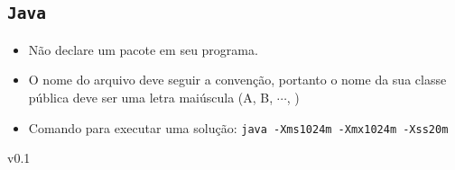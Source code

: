\documentclass{UnBExam}%
\newcommand{\infoFooter}{%
	\begin{center}\small v0.1\end{center}%
}%
\begin{document}
	\subsection*{\texttt{Java}}%
	\begin{itemize}%
		\setlength{\itemsep}{0pt}%
		\setlength{\parskip}{0pt}%
		\item Não declare um pacote em seu programa.%
		\item O nome do arquivo deve seguir a convenção, portanto o nome da sua classe pública deve ser uma letra maiúscula (A, B, $\cdots$, )
		\item Comando para executar uma solução: \texttt{java -Xms1024m -Xmx1024m -Xss20m}%
	\end{itemize}%
	\vfill%
	\infoFooter
\end{document}
